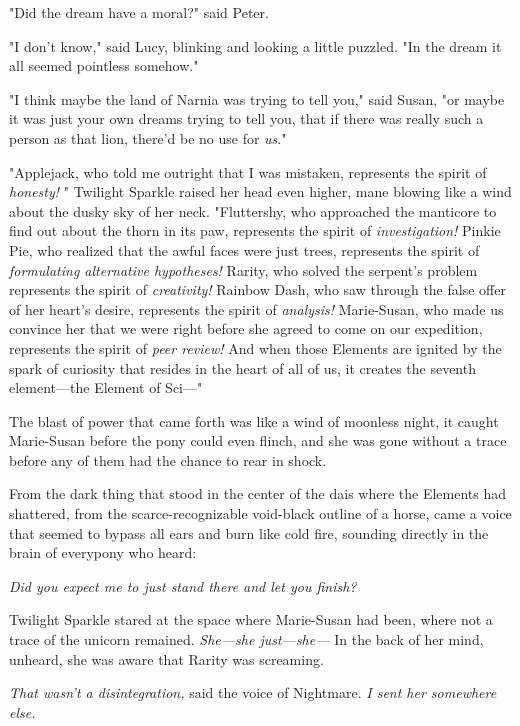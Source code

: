 "Did the dream have a moral?" said Peter.

"I don't know," said Lucy, blinking and looking a little puzzled. "In the dream
it all seemed pointless somehow."

"I think maybe the land of Narnia was trying to tell you," said Susan, "or
maybe it was just your own dreams trying to tell you, that if there was really
such a person as that lion, there'd be no use for \emph{us}."
\sbreak
{}

\noindent{}"Applejack, who told me outright that I was mistaken, represents the spirit
of{\el} \emph{honesty!} " Twilight Sparkle raised her head even higher, mane
blowing like a wind about the dusky sky of her neck. "Fluttershy, who
approached the manticore to find out about the thorn in its paw, represents the
spirit of{\el} \emph{investigation!} Pinkie Pie, who realized that the awful
faces were just trees, represents the spirit of{\el} \emph{formulating
alternative hypotheses!} Rarity, who solved the serpent's problem represents
the spirit of{\el} \emph{creativity!} Rainbow Dash, who saw through the
false offer of her heart's desire, represents the spirit of{\el}
\emph{analysis!} Marie-Susan, who made us convince her that we were right
before she agreed to come on our expedition, represents the spirit of{\el}
\emph{peer review!} And when those Elements are ignited by the spark of
curiosity that resides in the heart of all of us, it creates the seventh
element---the Element of Sci\mbox{---}"

The blast of power that came forth was like a wind of moonless night, it caught
Marie-Susan before the pony could even flinch, and she was gone without a trace
before any of them had the chance to rear in shock.

From the dark thing that stood in the center of the dais where the Elements had
shattered, from the scarce-recognizable void-black outline of a horse, came a
voice that seemed to bypass all ears and burn like cold fire, sounding directly
in the brain of everypony who heard:

\emph{Did you expect me to just stand there and let you finish?}

Twilight Sparkle stared at the space where Marie-Susan had been, where not a
trace of the unicorn remained. \emph{She---she just---she---} In the back of
her mind, unheard, she was aware that Rarity was screaming.

\emph{That wasn't a disintegration,} said the voice of Nightmare. \emph{I sent
her somewhere else.}

